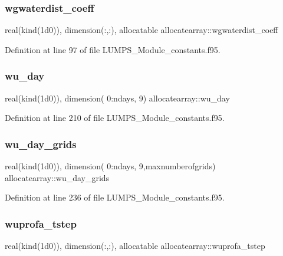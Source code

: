 \subsubsection{\texorpdfstring{wgwaterdist\+\_\+coeff}{wgwaterdist\_coeff}}
{\footnotesize\ttfamily real(kind(1d0)), dimension(\+:,\+:), allocatable allocatearray\+::wgwaterdist\+\_\+coeff}



Definition at line 97 of file L\+U\+M\+P\+S\+\_\+\+Module\+\_\+constants.\+f95.

\mbox{\label{namespaceallocatearray_a5a9854768fde92cc3ec838f8729f5d42}} 
\subsubsection{\texorpdfstring{wu\+\_\+day}{wu\_day}}
{\footnotesize\ttfamily real(kind(1d0)), dimension( 0\+:ndays, 9) allocatearray\+::wu\+\_\+day}



Definition at line 210 of file L\+U\+M\+P\+S\+\_\+\+Module\+\_\+constants.\+f95.

\mbox{\label{namespaceallocatearray_a979667a8feb8a3b2e63bedfbb7e25972}} 
\subsubsection{\texorpdfstring{wu\+\_\+day\+\_\+grids}{wu\_day\_grids}}
{\footnotesize\ttfamily real(kind(1d0)), dimension( 0\+:ndays, 9,maxnumberofgrids) allocatearray\+::wu\+\_\+day\+\_\+grids}



Definition at line 236 of file L\+U\+M\+P\+S\+\_\+\+Module\+\_\+constants.\+f95.

\mbox{\label{namespaceallocatearray_ab6f942b1808c9a62a4628cbd9e7e34a1}} 
\subsubsection{\texorpdfstring{wuprofa\+\_\+tstep}{wuprofa\_tstep}}
{\footnotesize\ttfamily real(kind(1d0)), dimension(\+:,\+:), allocatable allocatearray\+::wuprofa\+\_\+tstep}



